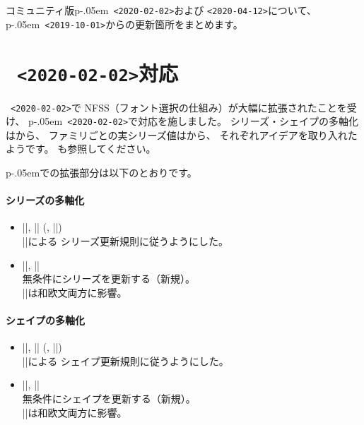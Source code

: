 \documentclass{plnews}
\author{日本語\TeX{}開発コミュニティ（\texttt{https://texjp.org/}）}
\def\pLaTeXe{p\kern-.05em\LaTeXe}
\begin{document}
\maketitle

コミュニティ版\pLaTeXe\ \texttt{<2020-02-02>}および
\texttt{<2020-04-12>}について、
\pLaTeXe\ \texttt{<2019-10-01>}からの更新箇所をまとめます。


\section{\LaTeXe\ \texttt{<2020-02-02>}対応}
\LaTeXe\ \texttt{<2020-02-02>}で
NFSS（フォント選択の仕組み）が大幅に拡張されたことを受け、
\pLaTeXe\ \texttt{<2020-02-02>}で対応を施しました。
シリーズ・シェイプの多軸化はから、
ファミリごとの実シリーズ値はから、
それぞれアイデアを取り入れたようです。
も参照してください。

\pLaTeXe{}での拡張部分は以下のとおりです。

\paragraph{シリーズの多軸化}
\begin{itemize}
 \item |\kanjiseries|, |\romanseries| (, |\fontseries|)\\
   |\DeclareFontSeriesChangeRule|による
   シリーズ更新規則に従うようにした。
 \item |\kanjiseriesforce|, |\romanseriesforce|\\
   無条件にシリーズを更新する（新規）。\\
   |\fontseriesforce|は和欧文両方に影響。
\end{itemize}

\paragraph{シェイプの多軸化}
\begin{itemize}
 \item |\kanjishape|, |\romanshape| (, |\fontshape|)\\
   |\DeclareFontShapeChangeRule|による
   シェイプ更新規則に従うようにした。
 \item |\kanjishapeforce|, |\romanshapeforce|\\
   無条件にシェイプを更新する（新規）。\\
   |\fontshapeforce|は和欧文両方に影響。
\end{itemize}
\end{document}
